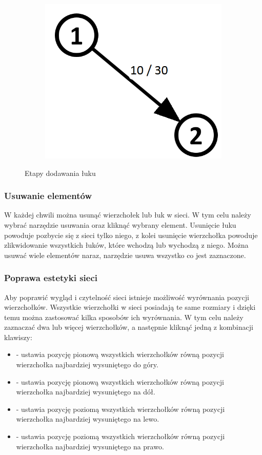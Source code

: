 \begin{figure}[h]
\begin{subfigure}{0.28\textwidth}
		\includegraphics[width=0.9\linewidth]{./img/spec_zew03_3.png}
		\label{fig:addEdge3}
	\end{subfigure}
	\caption{Etapy dodawania łuku}
	\label{fig:addEdge}
\end{figure}
\subsubsection{Usuwanie elementów}
W każdej chwili można usunąć wierzchołek lub łuk w sieci. W tym celu należy wybrać narzędzie usuwania oraz kliknąć wybrany element. Usunięcie łuku powoduje pozbycie się z sieci tylko niego, z kolei usunięcie wierzchołka powoduje zlikwidowanie wszystkich łuków, które wchodzą lub wychodzą z niego. Można usuwać wiele elementów naraz, narzędzie usuwa wszystko co jest zaznaczone. 
\subsubsection{Poprawa estetyki sieci}
Aby poprawić wygląd i czytelność sieci istnieje możliwość wyrównania pozycji wierzchołków. Wszystkie wierzchołki w sieci posiadają te same rozmiary i dzięki temu można zastosować kilka sposobów ich wyrównania. W tym celu należy zaznaczać dwa lub więcej wierzchołków, a następnie kliknąć jedną z kombinacji klawiszy:
\begin{itemize}
	\item \keys{\shift + \arrowkeyup} - ustawia pozycję pionową wszystkich wierzchołków równą pozycji wierzchołka najbardziej wysuniętego do góry.
	\item \keys{\shift + \arrowkeydown} - ustawia pozycję pionową wszystkich wierzchołków równą pozycji wierzchołka najbardziej wysuniętego na dół.
	\item \keys{\shift + \arrowkeyleft} - ustawia pozycję poziomą wszystkich wierzchołków równą pozycji wierzchołka najbardziej wysuniętego na lewo.
	\item \keys{\shift + \arrowkeyright} - ustawia pozycję poziomą wszystkich wierzchołków równą pozycji wierzchołka najbardziej wysuniętego na prawo.
\end{itemize}
